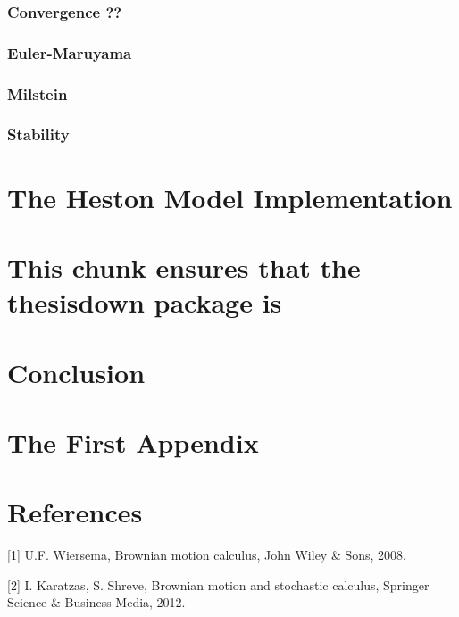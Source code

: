 \documentclass[12pt,twoside]{reedthesis}
\theoremstyle{definition}
\theoremstyle{definition}
\theoremstyle{remark}
\begin{document}
  \subsection{Convergence ??}\label{convergence}
  
  \subsection{Euler-Maruyama}\label{euler-maruyama}
  
  \subsection{Milstein}\label{milstein}
  
  \subsection{Stability}\label{stability}
  
  \chapter{The Heston Model
  Implementation}\label{the-heston-model-implementation}
  
  \chapter{This chunk ensures that the thesisdown package
  is}\label{this-chunk-ensures-that-the-thesisdown-package-is}
  
  \chapter{Conclusion}\label{conclusion}
  
  \chapter{The First Appendix}\label{the-first-appendix}
  
  \chapter*{References}\label{references}
  
  \hypertarget{refs}{}
  \hypertarget{ref-ubbo}{}
  {[}1{]} U.F. Wiersema, Brownian motion calculus, John Wiley \& Sons,
  2008.
  
  \hypertarget{ref-karatzas2012brownian}{}
  {[}2{]} I. Karatzas, S. Shreve, Brownian motion and stochastic calculus,
  Springer Science \& Business Media, 2012.
  
\end{document}
